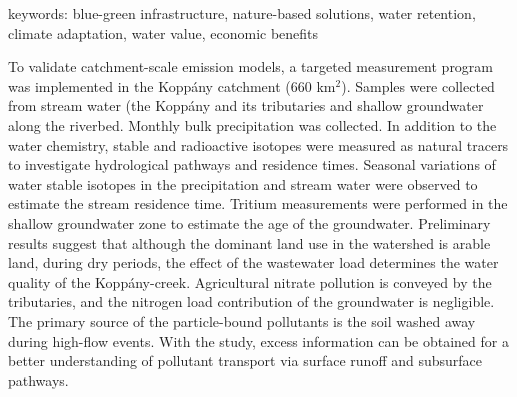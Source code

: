 keywords: blue-green infrastructure, nature-based solutions, water retention, climate adaptation, water value, economic benefits



\newpage{}
{}
\begin{flushleft}









\end{flushleft}

\noindent

To validate catchment-scale emission models, a targeted measurement program was implemented in the Koppány catchment (660 km$^2$). Samples were collected from stream water (the Koppány and its tributaries and shallow groundwater along the riverbed. Monthly bulk precipitation was collected. In addition to the water chemistry, stable and radioactive isotopes were measured as natural tracers to investigate hydrological pathways and residence times. Seasonal variations of water stable isotopes in the precipitation and stream water were observed to estimate the stream residence time. Tritium measurements were performed in the shallow groundwater zone to estimate the age of the groundwater. Preliminary results suggest that although the dominant land use in the watershed is arable land, during dry periods, the effect of the wastewater load determines the water quality of the Koppány-creek. Agricultural nitrate pollution is conveyed by the tributaries, and the nitrogen load contribution of the groundwater is negligible. The primary source of the particle-bound pollutants is the soil washed away during high-flow events. With the study, excess information can be obtained for a better understanding of pollutant transport via surface runoff and subsurface pathways.

